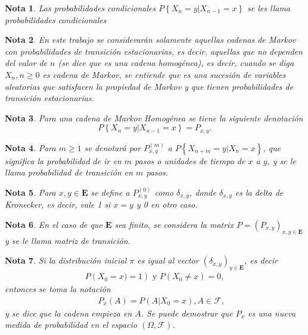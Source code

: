 \documentclass{article}
\newtheorem{Note}{Nota}%
\numberwithin{equation}{section}
\begin{document}
\begin{Note}
Las probabilidades condicionales $P\left\{X_{n}=y|X_{n-1}=x\right\}$ se les llama \textit{probabilidades condicionales}
\end{Note}

\begin{Note}
En este trabajo se considerar\'an solamente aquellas cadenas de Markov con probabilidades de transici\'on estacionarias, es decir, aquellas que no dependen del valor de $n$ (se dice que es una cadena homog\'enea), es decir, cuando se diga $X_{n},n\geq0$ es cadena de Markov, se entiende que es una sucesi\'on de variables aleatorias que satisfacen la propiedad de Markov y que tienen probabilidades de transici\'on estacionarias.
\end{Note}

\begin{Note}
Para una cadena de Markov Homog\'enea se tiene la siguiente denotaci\'on
\begin{equation}
P\left\{X_{n}=y|X_{n-1}=x\right\}=P_{x,y}.
\end{equation}
\end{Note}

\begin{Note}
Para $m\geq1$ se denotar\'a por $P^{(m)}_{x,y}$ a $P\left\{X_{n+m}=y|X_{n}=x\right\}$, que significa la probabilidad de ir en $m$ pasos o unidades de tiempo de $x$ a $y$, y se le llama \textit{probabilidad de transici\'on en $m$ pasos}.
\end{Note}

\begin{Note}
Para $x,y\in\mathbf{E}$ se define a $P^{(0)}_{x,y}$ como $\delta_{x,y}$, donde $\delta_{x,y}$ es la delta de Kronecker, es decir, vale 1 si $x=y$ y 0 en otro caso.
\end{Note}


\begin{Note}
En el caso de que $\mathbf{E}$ sea finito, se considera la matrix $P=\left(P_{x,y}\right)_{x,y\in \mathbf{E}}$ y se le llama \textit{matriz de transici\'on}.
\end{Note}


\begin{Note}
Si la distribuci\'on inicial $\pi$ es igual al vector $\left(\delta_{x,y}\right)_{y\in\mathbf{E}}$, es decir
\begin{eqnarray*}
P\left(X_{0}=x)=1\right)\textrm{ y }P\left(X_{0}\neq x\right)=0,
\end{eqnarray*}
entonces se toma la notaci\'on 
\begin{eqnarray}
&&P_{x}\left(A\right)=P\left(A|X_{0}=x\right),A\in\mathcal{F},
\end{eqnarray}
y se dice que la cadena empieza en $A$. Se puede demostrar que $P_{x}$ es una nueva medida de probabilidad en el espacio $\left(\Omega,\mathcal{F}\right)$.
\end{Note}
\end{document}
